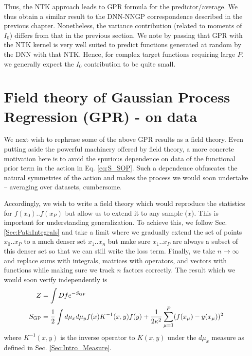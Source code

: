 Thus, the NTK approach leads to GPR formula for the predictor/average. We thus obtain a similar result to the DNN-NNGP correspondence described in the previous chapter. Nonetheless, the variance contribution (related to moments of $I_0$) differs from that in the previous section. We note by passing that GPR with the NTK kernel is very well suited to predict functions generated at random by the DNN with that NTK. Hence, for complex target functions requiring large $P$, we generally expect the $I_0$ contribution to be quite small.  

\section{Field theory of Gaussian Process Regression (GPR) - on data}
We next wish to rephrase some of the above GPR results as a field theory. Even putting aside the powerful machinery offered by field theory, a more concrete motivation here is to avoid the spurious dependence on data of the functional prior term in the action in Eq. \eqref{eq:S_SOP}. Such a dependence obfuscates the natural symmetries of the action and makes the process we would soon undertake -- averaging over datasets, cumbersome. 

Accordingly, we wish to write a field theory which would reproduce the statistics for $f(x_0)..f(x_P)$ but allow us to extend it to any sample ($x$). This is important for understanding generalization. To achieve this, we follow Sec. \ref{Sec:PathIntegrals} and take a limit where we gradually extend the set of points $x_0..x_P$ to a much denser set $x_1..x_n$ but make sure $x_1..x_P$ are always a subset of this denser set so that we can still write the loss term. Finally, we take $n\rightarrow \infty$ and replace sums with integrals, matrices with operators, and vectors with functions while making sure we track $n$ factors correctly.  The result which we would soon verify independently is 
\begin{align}
\label{Eq:Z_FieldTheoryOnData}
Z &= \int Df e^{-S_{\text{GP}}} \\ \nonumber
S_{\text{GP}} &= \frac{1}{2} \int d\mu_x d\mu_y f(x) K^{-1}(x,y) f(y) + \frac{1}{2\kappa^2}\sum_{\mu=1}^P (f(x_{\mu})-y(x_{\mu}))^2
\end{align}
where $K^{-1}(x,y)$ is the inverse operator to $K(x,y)$ under the $d\mu_x$ measure as defined in Sec. \ref{Sec:Intro_Measure}.

